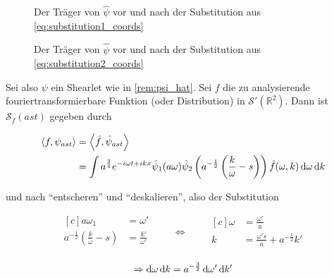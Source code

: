 \begin{figure}[h]
    \centering
    \begin{minipage}{0.5\textwidth}
        \centering
        \resizebox{\textwidth}{!}{} %
        \caption{Der Träger von $\hat\psi$ vor und nach der Substitution aus \cref{eq:substitution1_coords}}
        \label{fig:supp_psi_substitution1}
    \end{minipage}\hfill
    \begin{minipage}{0.5\textwidth}
        \centering
        \resizebox{\textwidth}{!}{}
        \caption{Der Träger von $\hat\psi$ vor und nach der Substitution aus \cref{eq:substitution2_coords}}
        \label{fig:supp_psi_substitution2}
    \end{minipage}
\end{figure}

Sei also $\psi$ ein Shearlet wie in \cref{rem:psi_hat}. Sei $f$ die zu
analysierende fouriertransformierbare Funktion (oder Distribution) in
$\mathcal{S}' (\mathbb{R}^2)$. Dann ist $\mathcal{S}_f (ast)$ gegeben durch

\begin{align*}
\left<f, \psi_{ast}\right> &= \left< \hat f, \hat\psi_{ast}\right> \\
 &= \int a^{\frac{3}{4}} e^{-i \omega t + ikx} \hat \psi_1(a \omega)
    \hat \psi_2 \left(a^{-\frac{1}{2}} \left(\frac{k}{\omega} - s\right)\right)
    \hat f (\omega,k) \mathop{}\!\mathrm{d} \omega \mathop{}\!\mathrm{d} k
\end{align*}

und nach "`entscheren"' und "`deskalieren"', also der Substitution

\begin{equation}
\begin{aligned}[c]
a \omega_1 &= \omega'\\
a^{-\frac{1}{2}} \left(\frac{k}{\omega} - s\right) &=\frac{k'}{\omega'}\\
\end{aligned}
\qquad\Longleftrightarrow\qquad
\begin{aligned}[c]
\omega &= \frac{\omega'}{a}\\
k &= \frac{\omega' s}{a} + a^{-\frac{1}{2}} k'\\
\end{aligned}
\label{eq:substitution1_coords}
\end{equation}

\begin{equation*}
\Rightarrow
\mathop{}\!\mathrm{d} \omega \mathop{}\!\mathrm{d} k = a^{-\frac{3}{2}} \mathop{}\!\mathrm{d} \omega' \mathop{}\!\mathrm{d} k'
\end{equation*}

